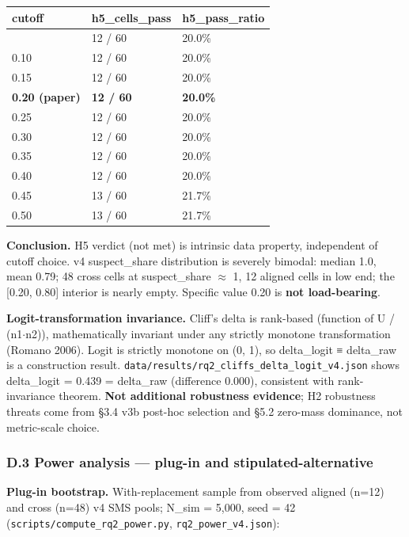 \documentclass[review,12pt,authoryear]{elsarticle}
\newcounter{none}                   %
\begin{document}
{\def\LTcaptype{none} %
\begin{longtable}[]{@{}lll@{}}
\toprule\noalign{}
cutoff & h5\_cells\_pass & h5\_pass\_ratio \\
\midrule\noalign{}
\endhead
\bottomrule\noalign{}
\endlastfoot
0.05 & 12 / 60 & 20.0\% \\
0.10 & 12 / 60 & 20.0\% \\
0.15 & 12 / 60 & 20.0\% \\
\textbf{0.20 (paper)} & \textbf{12 / 60} & \textbf{20.0\%} \\
0.25 & 12 / 60 & 20.0\% \\
0.30 & 12 / 60 & 20.0\% \\
0.35 & 12 / 60 & 20.0\% \\
0.40 & 12 / 60 & 20.0\% \\
0.45 & 13 / 60 & 21.7\% \\
0.50 & 13 / 60 & 21.7\% \\
\end{longtable}
}

\textbf{Conclusion.} H5 verdict (not met) is intrinsic data property,
independent of cutoff choice. v4 suspect\_share distribution is severely
bimodal: median 1.0, mean 0.79; 48 cross cells at suspect\_share $\approx$ 1, 12
aligned cells in low end; the {[}0.20, 0.80{]} interior is nearly empty.
Specific value 0.20 is \textbf{not load-bearing}.

\textbf{Logit-transformation invariance.} Cliff's delta is rank-based
(function of U / (n1$\cdot$n2)), mathematically invariant under any strictly
monotone transformation (Romano 2006). Logit is strictly monotone on (0,
1), so delta\_logit ≡ delta\_raw is a construction result.
\texttt{data/results/rq2\_cliffs\_delta\_logit\_v4.json} shows
delta\_logit = 0.439 = delta\_raw (difference 0.000), consistent with
rank-invariance theorem. \textbf{Not additional robustness evidence}; H2
robustness threats come from §3.4 v3b post-hoc selection and §5.2
zero-mass dominance, not metric-scale choice.

\subsubsection{D.3 Power analysis --- plug-in and
stipulated-alternative}\label{d.3-power-analysis-plug-in-and-stipulated-alternative}

\textbf{Plug-in bootstrap.} With-replacement sample from observed
aligned (n=12) and cross (n=48) v4 SMS pools; N\_sim = 5,000, seed = 42
(\texttt{scripts/compute\_rq2\_power.py}, \texttt{rq2\_power\_v4.json}):
\end{document}
